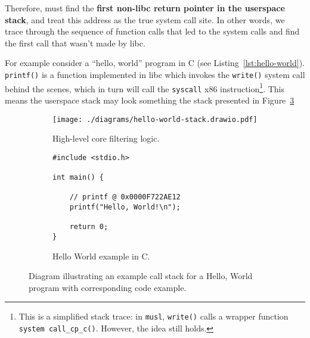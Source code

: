 Therefore, \af must find the \textbf{first non-\ac{libc} return pointer in the
userspace stack}, and treat this address as the true system call site. In other
words, we trace through the sequence of function calls that led to the system
calls and find the first call that wasn't made by libc.

For example consider a ``hello, world'' program in C (see Listing~\ref{lst:hello-world}). \texttt{printf()} is a 
function implemented in \ac{libc} which invokes the \texttt{write()} system call
behind the scenes, which in turn will call the \texttt{syscall} x86
instruction\footnote{This is a simplified stack trace: in \texttt{musl},
\texttt{write()} calls a wrapper function \texttt{system call\_cp\_c()}. However,
the idea still holds.}. This means the userspace stack may look something the stack
presented in Figure~\ref{fig:hello-world-stack}

\begin{figure}[h]
    \centering %

    \begin{subfigure}[b]{0.48\linewidth} %
        \centering %
        \texttt{[image: ./diagrams/hello-world-stack.drawio.pdf]}
        \caption{High-level \afg core filtering logic.} %
        \label{subfig:stack-diagram} %
    \end{subfigure}
    \hfill %
    \begin{subfigure}[b]{0.48\linewidth} %
        \centering %
        \begin{verbatim}
#include <stdio.h>

int main() {

    // printf @ 0x0000F722AE12
    printf("Hello, World!\n");    

    return 0;
}
        \end{verbatim}
        \caption{Hello World example in C.} %
        \label{subfig:hello-world-code} %
    \end{subfigure}

    \caption{Diagram illustrating an example call stack for a Hello, World
    program with corresponding code example.}%
    \label{fig:hello-world-stack} %

\end{figure}

